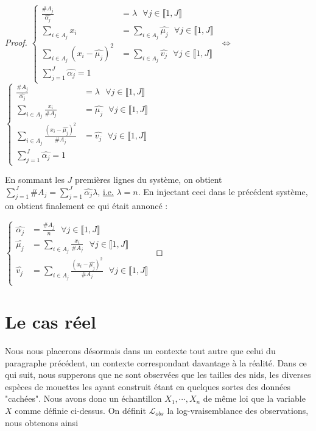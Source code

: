 \documentclass[frenchb]{report}
\newcommand{\1}{\mathbbm{1}}
\theoremstyle{definition}\newtheorem{defn}{Définition}
\theoremstyle{definition}\newtheorem{exm}{Exemple}
\theoremstyle{definition}\newtheorem{nota}{Notation}
\theoremstyle{definition}\newtheorem{rem}{Remarque}
\begin{document}
\begin{proof}
$
\begin{cases}
\displaystyle\frac{\#A_j}{\hat{\alpha_j}} &= \lambda \text{ } \forall j \in \llbracket 1,J \rrbracket \\
\displaystyle\sum_{i\in A_j}x_i & =\displaystyle\sum_{i\in A_j} \hat{\mu_j} \text{ } \forall j \in \llbracket 1,J \rrbracket \\
\displaystyle\sum_{i\in A_j} (x_i-\hat{\mu_j})^2 &= \displaystyle\sum_{i\in A_j} \hat{v_j}  \text{ } \forall j \in \llbracket 1,J \rrbracket \\
\displaystyle\sum_{j=1}^J \hat{\alpha_j} = 1
\end{cases}
$
$\Leftrightarrow$
$
\begin{cases}
\displaystyle\frac{\#A_j}{\hat{\alpha_j}} &= \lambda \text{ } \forall j \in \llbracket 1,J \rrbracket \\
\displaystyle\sum_{i\in A_j}\frac{x_i}{\#A_j} & = \hat{\mu_j} \text{ } \forall j \in \llbracket 1,J \rrbracket \\
\displaystyle\sum_{i\in A_j} \frac{(x_i-\hat{\mu_j})^2}{\#A_j} &=  \hat{v_j}  \text{ } \forall j \in \llbracket 1,J \rrbracket \\
\displaystyle\sum_{j=1}^J \hat{\alpha_j} = 1
\end{cases}
$

En sommant les $J$ premières lignes du système, on obtient $\displaystyle\sum_{j=1}^J\#A_j = \sum_{j=1}^J\hat{\alpha_j}\lambda$, \underline{i.e.} $\lambda = n$. En injectant ceci dans le précédent système, on obtient finalement ce qui était annoncé :

$
\begin{cases}
\hat{\alpha_j} &= \displaystyle \frac{\#A_j}{n} \text{ } \forall j \in \llbracket 1,J \rrbracket \\
\hat{\mu_j} &= \displaystyle\sum_{i\in A_j}\frac{x_i}{\#A_j} \text{ } \forall j \in \llbracket 1,J \rrbracket \\
\hat{v_j} &= \displaystyle\sum_{i\in A_j} \frac{(x_i-\hat{\mu_j})^2}{\#A_j}  \text{ } \forall j \in \llbracket 1,J \rrbracket \\
\end{cases}
$
\end{proof}


\section{Le cas réel}
Nous nous placerons désormais dans un contexte tout autre que celui du paragraphe précédent, un contexte correspondant davantage à la réalité. Dans ce qui suit, nous supperons que ne sont observées que les tailles des nids, les diverses espèces de mouettes les ayant construit étant en quelques sortes des données "cachées". Nous avons donc un échantillon $X_1,\cdots, X_n$ de même loi que la variable $X$ comme définie ci-dessus. \newline
On définit $\mathcal{L}_{obs}$ la log-vraisemblance des observations, nous obtenons ainsi 
\end{document}
